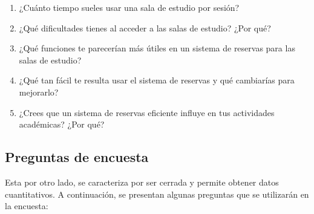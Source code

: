 \documentclass{article}
\begin{document}
\begin{enumerate}
  \item ¿Cuánto tiempo sueles usar una sala de estudio por sesión?
  \item ¿Qué dificultades tienes al acceder a las salas de estudio? ¿Por qué?
  \item ¿Qué funciones te parecerían más útiles en un sistema de reservas para las salas de estudio?
  \item ¿Qué tan fácil te resulta usar el sistema de reservas y qué cambiarías para mejorarlo?
  \item ¿Crees que un sistema de reservas eficiente influye en tus actividades académicas? ¿Por qué?
\end{enumerate}

\subsection{Preguntas de encuesta}

Esta por otro lado, se caracteriza por ser cerrada y permite obtener datos cuantitativos. A continuación, se presentan algunas preguntas que se utilizarán en la encuesta:
\end{document}
